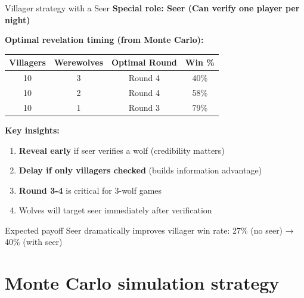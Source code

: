 \documentclass[10pt]{beamer}
\begin{document}
\begin{frame}{Villager strategy with a Seer}
  \textbf{Special role: Seer (Can verify one player per night)}

  \vspace{0.3cm}
  \textbf{Optimal revelation timing (from Monte Carlo):}
  
  \begin{center}
    \begin{tabular}{cccc}
      \hline
      \textbf{Villagers} & \textbf{Werewolves} & \textbf{Optimal Round} & \textbf{Win \%} \\
      \hline
      10 & 3 & Round 4 & 40\% \\
      10 & 2 & Round 4 & 58\% \\
      10 & 1 & Round 3 & 79\% \\
      \hline
    \end{tabular}
  \end{center}

  \vspace{0.5cm}
  \textbf{Key insights:}
  \begin{enumerate}
    \item \textbf{Reveal early} if seer verifies a wolf (credibility matters)
    \item \textbf{Delay if only villagers checked} (builds information advantage)
    \item \textbf{Round 3-4} is critical for 3-wolf games
    \item Wolves will target seer immediately after verification
  \end{enumerate}

  \begin{alertblock}{Expected payoff}
    Seer dramatically improves villager win rate: 27\% (no seer) → 40\% (with seer)
  \end{alertblock}
\end{frame}

\section{Monte Carlo simulation strategy}
\end{document}
